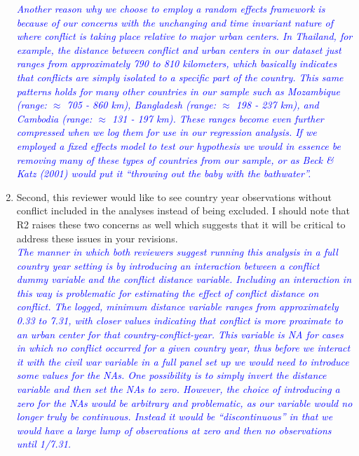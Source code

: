 \begin{enumerate}
\textcolor{blue}{\emph{
	Another reason why we choose to employ a random effects framework is because of our concerns with the unchanging and time invariant nature of where conflict is taking place relative to major urban centers. In Thailand, for example, the distance between conflict and urban centers in our dataset just ranges from approximately 790 to 810 kilometers, which basically indicates that conflicts are simply isolated to a specific part of the country. This same patterns holds for many other countries in our sample such as Mozambique (range: $\approx$ 705 - 860 km), Bangladesh (range: $\approx$ 198 - 237 km), and Cambodia (range: $\approx$ 131 - 197 km). These ranges become even further compressed when we log them for use in our regression analysis. If we employed a fixed effects model to test our hypothesis we would in essence be removing many of these types of countries from our sample, or as Beck \& Katz (2001) would put it ``throwing out the baby with the bathwater''. 
}}

\item Second, this reviewer would like to see country year observations without conflict included in the analyses instead of being excluded. I should note that R2 raises these two concerns as well which suggests that it will be critical to address these issues in your revisions. \\

\textcolor{blue}{\emph{
	The manner in which both reviewers suggest running this analysis in a full country year setting is by introducing an interaction between a conflict dummy variable and the conflict distance variable. Including an interaction in this way is problematic for estimating the effect of conflict distance on conflict. The logged, minimum distance variable ranges from approximately 0.33 to 7.31, with closer values indicating that conflict is more proximate to an urban center for that country-conflict-year. This variable is NA for cases in which no conflict occurred for a given country year, thus before we interact it with the civil war variable in a full panel set up we would need to introduce some values for the NAs. One possibility is to simply invert the distance variable and then set the NAs to zero. However, the choice of introducing a zero for the NAs would be arbitrary and problematic, as our variable would no longer truly be continuous. Instead it would be ``discontinuous'' in that we would have a large lump of observations at zero and then no observations until 1/7.31.
}} 


\end{enumerate}

